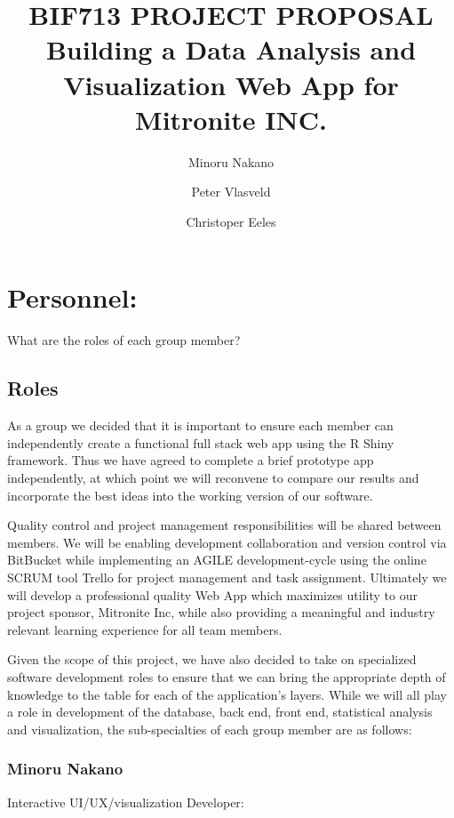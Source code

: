 \documentclass[10pt,twocolumn,letterpaper]{article}
\title{
		\usefont{OT1}{bch}{b}{n}
		\normalfont \normalsize \textsc{BIF713 PROJECT PROPOSAL} \\ [14pt]
		\huge Building a Data Analysis and Visualization Web App for Mitronite INC. \\
}
\author{Minoru Nakano}
\author{Peter Vlasveld}
\author{Christoper Eeles}
\begin{document}
\maketitle


\section{Personnel:}
    	
    	What are the roles of each group member?

            \subsection{Roles}

            As a group we decided that it is important to ensure each member can independently create a functional full stack web app using the R Shiny framework.
	    Thus we have agreed to complete a brief prototype app independently, at which point we will reconvene to compare our results and incorporate the best
	    ideas into the working version of our software.
		
	Quality control and project management responsibilities will be shared between members. 
	We will be enabling development collaboration and version control via BitBucket while implementing an 
	AGILE development-cycle using the online SCRUM tool Trello for project management and task assignment.
        Ultimately we will develop a professional quality Web App which maximizes utility to our project sponsor, 
	Mitronite Inc, while also providing a meaningful and industry relevant learning experience for all team members.

            Given the scope of this project, we have also decided to take on specialized software development roles to ensure that we can bring the appropriate depth
	    of knowledge to the table for each of the application's layers.
	    While we will all play a role in development of the database, back end, front end, statistical analysis and visualization, the sub-specialties of each group
	    member are as follows:

                \subsubsection*{Minoru Nakano}

                Interactive UI/UX/visualization Developer:
\end{document}
